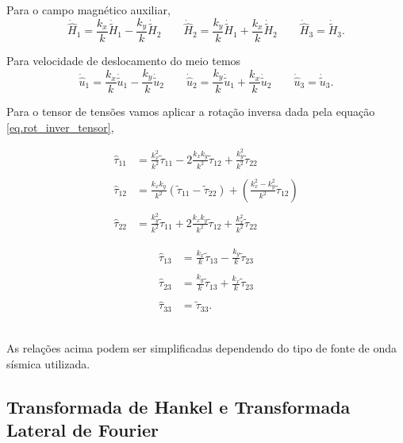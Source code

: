 Para o campo magn\'etico auxiliar,
\begin{equation*}
\dot{\hat{H}}_1=\frac{k_x}{k}\dot{\tilde{H}}_1-\frac{k_y}{k}\dot{\tilde{H}}_2\qquad
\dot{\hat{H}}_2=\frac{k_y}{k}\dot{\tilde{H}}_1+\frac{k_x}{k}\dot{\tilde{H}}_2\qquad
\dot{\hat{H}}_3=\dot{\tilde{H}}_3.
\end{equation*}


Para velocidade de deslocamento do meio temos
\begin{equation*}
\dot{\hat{u}}_1=\frac{k_x}{k}\dot{\tilde{u}}_1-\frac{k_y}{k}\dot{\tilde{u}}_2\qquad
\dot{\hat{u}}_2=\frac{k_y}{k}\dot{\tilde{u}}_1+\frac{k_x}{k}\dot{\tilde{u}}_2\qquad
\dot{\hat{u}}_3=\dot{\tilde{u}}_3.
\end{equation*}

Para o tensor de tens\~oes vamos aplicar a rota\c{c}\~ao inversa dada pela equa\c{c}\~ao \ref{eq.rot_inver_tensor},\\
\begin{minipage}{.5\textwidth}
\begin{align*}
\hat{\tau}_{11}&=\frac{k_x^2}{k^2}\tilde{\tau}_{11}-2\frac{k_xk_y}{k^2}\tilde{\tau}_{12}+\frac{k_y^2}{k^2}\tilde{\tau}_{22}\\\\
\hat{\tau}_{12}&=\frac{k_xk_y}{k^2}(\tilde{\tau}_{11}-\tilde{\tau}_{22})+\left(\frac{k_x^2-k_y^2}{k^2}\tilde{\tau}_{12}\right)\\\\
\hat{\tau}_{22}&=\frac{k_y^2}{k^2}\tilde{\tau}_{11}+2\frac{k_xk_y}{k^2}\tilde{\tau}_{12}+\frac{k_x^2}{k^2}\tilde{\tau}_{22}
\end{align*}
\end{minipage}
\begin{minipage}{.5\textwidth}
\begin{align*}
\hat{\tau}_{13}&=\frac{k_x}{k}\tilde{\tau}_{13}-\frac{k_y}{k}\tilde{\tau}_{23}\\\\
\hat{\tau}_{23}&=\frac{k_y}{k}\tilde{\tau}_{13}+\frac{k_x}{k}\tilde{\tau}_{23}\\\\
\hat{\tau}_{33}&=\tilde{\tau}_{33}.
\end{align*}
\end{minipage}\\


As rela\c{c}\~oes acima podem ser simplificadas dependendo do tipo de fonte de onda s\'ismica utilizada.


\subsection{Transformada de Hankel e Transformada Lateral de Fourier}

